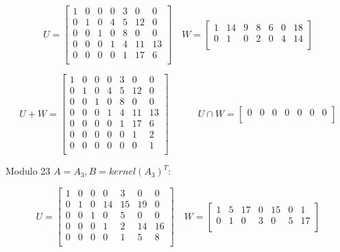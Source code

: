 \documentclass[10pt,a4paper]{report}
\begin{document}
\begin{equation*}
U=\begin{bmatrix}
1 & 0 & 0 & 0 & 3 & 0 & 0 \\
0 & 1 & 0 & 4 & 5 & 12 & 0 \\
0 & 0 & 1 & 0 & 8 & 0 & 0 \\
0 & 0 & 0 & 1 & 4 & 11 & 13 \\
0 & 0 & 0 & 0 & 1 & 17 & 6 \\
\end{bmatrix}
\quad
W=\begin{bmatrix}
1 & 14 & 9 & 8 & 6 & 0 & 18 \\
0 & 1 & 0 & 2 & 0 & 4 & 14 \\
\end{bmatrix}
\end{equation*}

\begin{equation*}
U+W=\begin{bmatrix}
1 & 0 & 0 & 0 & 3 & 0 & 0 \\
0 & 1 & 0 & 4 & 5 & 12 & 0 \\
0 & 0 & 1 & 0 & 8 & 0 & 0 \\
0 & 0 & 0 & 1 & 4 & 11 & 13 \\
0 & 0 & 0 & 0 & 1 & 17 & 6 \\
0 & 0 & 0 & 0 & 0 & 1 & 2 \\
0 & 0 & 0 & 0 & 0 & 0 & 1 \\
\end{bmatrix}
\quad \quad \quad
U \cap W=\begin{bmatrix}
0 & 0 & 0 & 0 & 0 & 0 & 0 \\
\end{bmatrix}
\end{equation*}

\vspace{1cm}

Modulo 23 $A=A_3, B=kernel(A_3)^T$:


\begin{equation*}
U=\begin{bmatrix}
1 & 0 & 0 & 0 & 3 & 0 & 0 \\
0 & 1 & 0 & 14 & 15 & 19 & 0 \\
0 & 0 & 1 & 0 & 5 & 0 & 0 \\
0 & 0 & 0 & 1 & 2 & 14 & 16 \\
0 & 0 & 0 & 0 & 1 & 5 & 8 \\
\end{bmatrix}
\quad
W=\begin{bmatrix}
1 & 5 & 17 & 0 & 15 & 0 & 1 \\
0 & 1 & 0 & 3 & 0 & 5 & 17 \\
\end{bmatrix}
\end{equation*}
\end{document}
